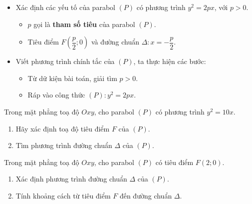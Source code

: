 \begin{dang}
	\begin{itemize}
	\item Xác định các yếu tố của parabol $(P)$ có phương trình $y^2=2px$, với $p>0$.
	\begin{itemize}
		\item $p$ gọi là \textbf{tham số tiêu} của parabol $(P)$.
		\item Tiêu điểm $F\left(\dfrac{p}{2} ; 0\right)$ và đường chuẩn $\Delta: x=-\dfrac{p}{2}$.
	\end{itemize}
	\item Viết phương trình chính tắc của $(P)$, ta thực hiện các bước:
	\begin{itemize}
		\item Từ dữ kiện bài toán, giải tìm $p>0$. 
		\item Ráp vào công thức $(P)\colon y^2=2px$.
	\end{itemize}
\end{itemize}
\end{dang}
\begin{vd}%
	Trong mặt phẳng toạ độ $Oxy$, cho parabol $(P)$ có phương trình $y^2=10x$.
	\begin{enumerate}
		\item Hãy xác định toạ độ tiêu điểm $F$ của $(P)$.
		\item Tìm phương trình đường chuẩn $\Delta$ của $(P)$.
	\end{enumerate}
\end{vd}
\begin{vd}%
	Trong mặt phẳng toạ độ $Oxy$, cho parabol $(P)$ có tiêu điểm $F(2;0)$.
	\begin{enumerate}
		\item Xác định phương trình đường chuẩn $\Delta$ của $(P)$.
		\item Tính khoảng cách từ tiêu điểm $F$ đến đường chuẩn $\Delta$.
	\end{enumerate}
\end{vd}
